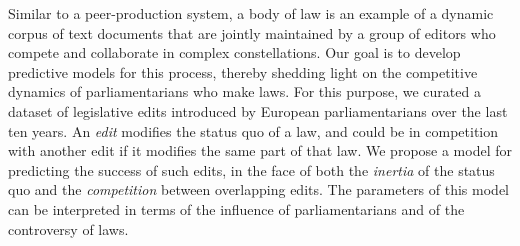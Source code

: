 
Similar to a peer-production system, a body of law is an example of a dynamic corpus of text documents that are jointly maintained by a group of editors who compete and collaborate in complex constellations.
Our goal is to develop predictive models for this process, thereby shedding light on the competitive dynamics of parliamentarians who make laws.
For this purpose, we curated a dataset of  legislative edits introduced by European parliamentarians over the last ten years.
An \textit{edit} modifies the status quo of a law, and could be in competition with another edit if it modifies the same part of that law.
We propose a model for predicting the success of such edits, in the face of both the \textit{inertia} of the status quo and the \textit{competition} between overlapping edits.
The parameters of this model can be interpreted in terms of the influence of parliamentarians and of the controversy of laws.
